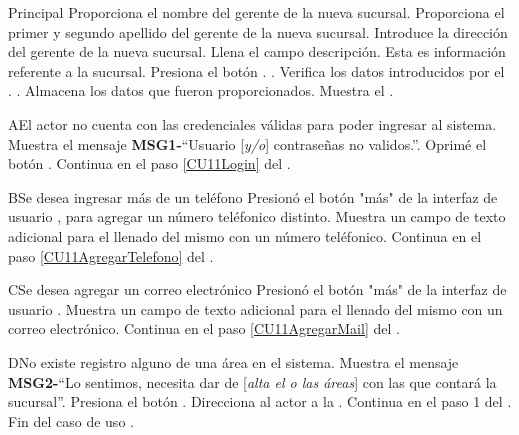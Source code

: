 \begin{UCtrayectoria}{Principal}
		\UCpaso[\UCactor] Proporciona el nombre del gerente de la nueva sucursal.
		\UCpaso[\UCactor] Proporciona el primer y segundo apellido del gerente de la nueva sucursal.
		\UCpaso[\UCactor] Introduce la dirección del gerente de la nueva sucursal.
		\UCpaso[\UCactor] Llena el campo descripción. Esta es información referente a la sucursal.
		\UCpaso[\UCactor] Presiona el botón . \label{CU11EnviarFormulario}.
		\UCpaso Verifica los datos introducidos por el \UCactor.  .
		\UCpaso Almacena los datos que fueron proporcionados.
		\UCpaso Muestra el . 
	\end{UCtrayectoria}
		
		\begin{UCtrayectoriaA}{A}{El actor no cuenta con las credenciales válidas para poder ingresar al sistema.}
			\UCpaso Muestra el mensaje {\bf MSG1-}``Usuario [{\em y/o}] contraseñas no validos.''.
			\UCpaso[\UCactor] Oprimé el botón .
			\UCpaso Continua en el paso \ref{CU11Login} del .
		\end{UCtrayectoriaA}
		
		\begin{UCtrayectoriaA}{B}{Se desea ingresar más de un teléfono}
			\UCpaso[\UCactor] Presionó el botón "más" de la interfaz de usuario , para agregar un número teléfonico distinto.
			\UCpaso Muestra un campo de texto adicional para el llenado del mismo con un número teléfonico.
			\UCpaso Continua en el paso \ref{CU11AgregarTelefono} del . 
		\end{UCtrayectoriaA}
		
		\begin{UCtrayectoriaA}{C}{Se desea agregar un correo electrónico}
			\UCpaso[\UCactor] Presionó el botón "más" de la interfaz de usuario .
			\UCpaso Muestra un campo de texto adicional para el llenado del mismo con un correo electrónico.
			\UCpaso Continua en el paso \ref{CU11AgregarMail} del . 
		\end{UCtrayectoriaA}		
		
		\begin{UCtrayectoriaA}{D}{No existe registro alguno de una área en el sistema.}
			\UCpaso Muestra el mensaje {\bf MSG2-}``Lo sentimos, necesita dar de [{\em alta el o las áreas}] con las que contará la sucursal''.
			\UCpaso[\UCactor] Presiona el botón .
			\UCpaso Direcciona al actor a la .
			\UCpaso Continua en el paso 1 del .
			Fin del caso de uso .
		\end{UCtrayectoriaA}

